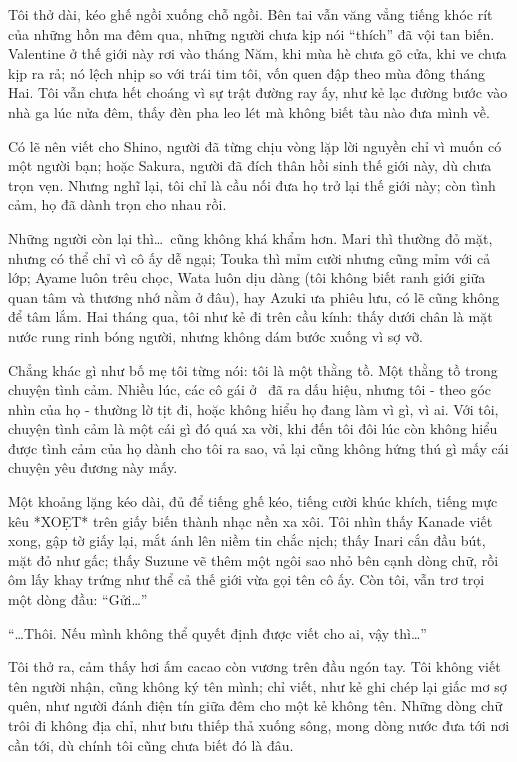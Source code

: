 \documentclass[../main.tex]{subfiles}
\begin{document}
Tôi thở dài, kéo ghế ngồi xuống chỗ ngồi. Bên tai vẫn văng vẳng tiếng khóc rít của những hồn ma đêm qua, những người chưa kịp nói ``thích'' đã vội tan biến. Valentine ở thế giới này rơi vào tháng Năm, khi mùa hè chưa gõ cửa, khi ve chưa kịp ra rả; nó lệch nhịp so với trái tim tôi, vốn quen đập theo mùa đông tháng Hai. Tôi vẫn chưa hết choáng vì sự trật đường ray ấy, như kẻ lạc đường bước vào nhà ga lúc nửa đêm, thấy đèn pha leo lét mà không biết tàu nào đưa mình về.

Có lẽ nên viết cho Shino, người đã từng chịu vòng lặp lời nguyền chỉ vì muốn có một người bạn; hoặc Sakura, người đã đích thân hồi sinh thế giới này, dù chưa trọn vẹn. Nhưng nghĩ lại, tôi chỉ là cầu nối đưa họ trở lại thế giới này; còn tình cảm, họ đã dành trọn cho nhau rồi.

Những người còn lại thì\dots\ cũng không khá khẩm hơn. Mari thì thường đỏ mặt, nhưng có thể chỉ vì cô ấy dễ ngại; Touka thì mỉm cười nhưng cũng mỉm với cả lớp; Ayame luôn trêu chọc, Wata luôn dịu dàng (tôi không biết ranh giới giữa quan tâm và thương nhớ nằm ở đâu), hay Azuki ưa phiêu lưu, có lẽ cũng không để tâm lắm. Hai tháng qua, tôi như kẻ đi trên cầu kính: thấy dưới chân là mặt nước rung rinh bóng người, nhưng không dám bước xuống vì sợ vỡ.

Chẳng khác gì như bố mẹ tôi từng nói: tôi là một thằng tồ. Một thằng tồ trong chuyện tình cảm. Nhiều lúc, các cô gái ở \hll\ đã ra dấu hiệu, nhưng tôi - theo góc nhìn của họ - thường lờ tịt đi, hoặc không hiểu họ đang làm vì gì, vì ai. Với tôi, chuyện tình cảm là một cái gì đó quá xa vời, khi đến tôi đôi lúc còn không hiểu được tình cảm của họ dành cho tôi ra sao, vả lại cũng không hứng thú gì mấy cái chuyện yêu đương này mấy.

Một khoảng lặng kéo dài, đủ để tiếng ghế kéo, tiếng cười khúc khích, tiếng mực kêu *XOẸT* trên giấy biến thành nhạc nền xa xôi. Tôi nhìn thấy Kanade viết xong, gập tờ giấy lại, mắt ánh lên niềm tin chắc nịch; thấy Inari cắn đầu bút, mặt đỏ như gấc; thấy Suzune vẽ thêm một ngôi sao nhỏ bên cạnh dòng chữ, rồi ôm lấy khay trứng như thể cả thế giới vừa gọi tên cô ấy. Còn tôi, vẫn trơ trọi một dòng đầu: ``Gửi\dots''

``\dots Thôi. Nếu mình không thể quyết định được viết cho ai, vậy thì\dots''

Tôi thở ra, cảm thấy hơi ấm cacao còn vương trên đầu ngón tay. Tôi không viết tên người nhận, cũng không ký tên mình; chỉ viết, như kẻ ghi chép lại giấc mơ sợ quên, như người đánh điện tín giữa đêm cho một kẻ không tên. Những dòng chữ trôi đi không địa chỉ, như bưu thiếp thả xuống sông, mong dòng nước đưa tới nơi cần tới, dù chính tôi cũng chưa biết đó là đâu.
\end{document}
